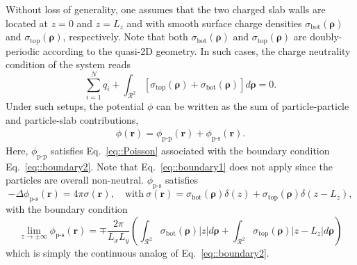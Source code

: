 Without loss of generality, one assumes that the two charged slab walls are located at $z=0$ and $z=L_z$ and with smooth surface charge densities $\sigma_{\mathrm{bot}}(\bm{\rho})$ and $\sigma_{\mathrm{top}}(\bm{\rho})$, respectively. Note that both $\sigma_{\mathrm{bot}}(\bm{\rho})$ and $\sigma_{\mathrm{top}}(\bm{\rho})$ are doubly-periodic according to the quasi-2D geometry. In such cases, the charge neutrality condition of the system reads
\begin{equation}\label{eq::chargeneu}
 	\sum_{i=1}^{N}q_{i} + \int_{\mathcal{R}^2} \left[\sigma_{\mathrm{top}} (\bm{\rho}) + \sigma_{\mathrm{bot}}(\bm{\rho}) \right] d\bm{\rho} = 0.
\end{equation} 
Under such setups, the potential $\phi$ can be written as the sum of particle-particle and particle-slab contributions,
\begin{align}
	\phi(\bm{r})=\phi_{\text{p-p}}(\bm{r})+\phi_{\text{p-s}}(\bm{r}).
\end{align}
Here, $\phi_{\text{p-p}}$ satisfies Eq.~\eqref{eq::Poisson} associated with the boundary condition Eq.~\eqref{eq::boundary2}. Note that Eq.~\eqref{eq::boundary1} does not apply since the particles are overall non-neutral. $\phi_{\text{p-s}}$ satisfies 
\begin{equation}\label{eq::PoionWall}
	-\Delta \phi_{\text{p-s}}(\bm{r}) = 4\pi \sigma(\bm{r}), \quad \text{with}~ \sigma(\bm{r}) =  \sigma_{\mathrm{bot}}(\bm{\rho}) \delta(z) + \sigma_{\mathrm{top}}(\bm{\rho}) \delta(z-L_z),
\end{equation}
with the boundary condition
\begin{equation}\label{eq::boundionwall}
	\lim_{z\rightarrow\pm\infty}\phi_{\text{p-s}}(\bm{r})=\mp \frac{2\pi}{L_xL_y}\left(\int_{\mathcal{R}^2}\sigma_{\mathrm{bot}}(\bm{\rho})|z|d\bm{\rho}+\int_{\mathcal{R}^2}\sigma_{\mathrm{top}}(\bm{\rho})|z-L_z|d\bm{\rho}\right)
\end{equation}
which is simply the continuous analog of Eq.~\eqref{eq::boundary2}. 

